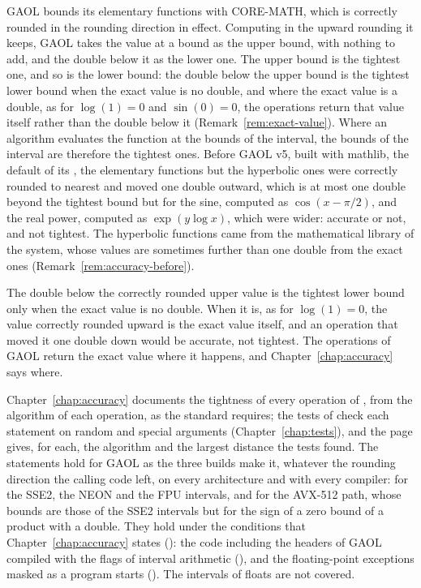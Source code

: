 \medskip
GAOL bounds its elementary functions with CORE-MATH, which is correctly
rounded in the rounding direction in effect. Computing in the upward
rounding it keeps, GAOL takes the value at a bound as the upper bound, with
nothing to add, and the double below it as the lower one. The upper bound is
the tightest one, and so is the lower bound: the double below the upper bound
is the tightest lower bound when the exact value is no double, and where the
exact value is a double, as for $\log(1)=0$ and $\sin(0)=0$, the operations
return that value itself rather than the double below it
(Remark~\ref{rem:exact-value}). Where an algorithm
evaluates the function at the bounds of the interval, the bounds of the
interval are therefore the tightest ones. Before GAOL v5, built with mathlib,
the default of its , the elementary functions but the hyperbolic
ones were correctly rounded to nearest and moved one double outward, which is
at most one double beyond the tightest bound but for the sine, computed as
$\cos(x-\pi/2)$, and the real power, computed as $\exp(y\log x)$, which were
wider: accurate or not, and not tightest. The
hyperbolic functions came from the mathematical library of the system, whose
values are sometimes further than one double from the exact ones
(Remark~\ref{rem:accuracy-before}).\newinvfive

\begin{Rem}\label{rem:exact-value}
The double below the correctly rounded upper value is the tightest lower
bound only when the exact value is no double. When it is, as for
$\log(1)=0$, the value correctly rounded upward is the exact value itself,
and an operation that moved it one double down would be accurate, not
tightest. The operations of GAOL return the exact value where it happens,
and Chapter~\ref{chap:accuracy} says where.
\end{Rem}

\medskip
Chapter~\ref{chap:accuracy} documents the tightness of every operation of
, from the algorithm of each operation, as the standard
requires; the tests of  check each statement on random and
special arguments (Chapter~\ref{chap:tests}), and the page 
gives, for each, the algorithm and the largest distance the tests
found.\newinvfive{} The statements hold for GAOL as the three builds make
it, whatever the rounding direction the calling code left, on every
architecture and with every compiler: for the SSE2, the NEON and the FPU
intervals, and for the AVX-512 path, whose bounds are those of the SSE2
intervals but for the sign of a zero bound of a product with a double. They hold under the conditions that Chapter~\ref{chap:accuracy} states
(): the
code including the headers of GAOL compiled with the flags of interval
arithmetic (), and the floating-point exceptions
masked as a program starts (). The intervals of
floats are not covered.

